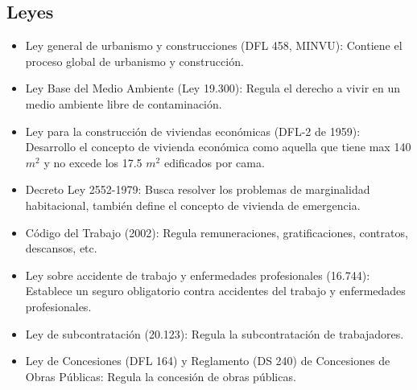 \documentclass{article} %
\begin{document}
\subsection{Leyes}

\begin{itemize}[label={},left=0pt,align=parleft]
    \item \begin{highlightbox}[levelone] Ley general de urbanismo y construcciones (DFL 458, MINVU): Contiene el proceso global de urbanismo y construcción. \end{highlightbox}
    \item \begin{highlightbox}[levelone] Ley Base del Medio Ambiente (Ley 19.300): Regula el derecho a vivir en un medio ambiente libre de contaminación. \end{highlightbox}
    \item \begin{highlightbox}[levelone] Ley para la construcción de viviendas económicas (DFL-2 de 1959): Desarrollo el concepto de vivienda económica como aquella que tiene max 140 $m^2$ y no excede los 17.5 $m^2$ edificados por cama. \end{highlightbox}
    \item \begin{highlightbox}[levelone] Decreto Ley 2552-1979: Busca resolver los problemas de marginalidad habitacional, también define el concepto de vivienda de emergencia. \end{highlightbox}
    \item \begin{highlightbox}[levelone] Código del Trabajo (2002): Regula remuneraciones, gratificaciones, contratos, descansos, etc. \end{highlightbox}
    \item \begin{highlightbox}[levelone] Ley sobre accidente de trabajo y enfermedades profesionales (16.744): Establece un seguro obligatorio contra accidentes del trabajo y enfermedades profesionales. \end{highlightbox}
    \item \begin{highlightbox}[levelone] Ley de subcontratación (20.123): Regula la subcontratación de trabajadores. \end{highlightbox}
    \item \begin{highlightbox}[levelone] Ley de Concesiones (DFL 164) y Reglamento (DS 240) de Concesiones de Obras Públicas: Regula la concesión de obras públicas. \end{highlightbox}

\end{itemize}
\end{document}
